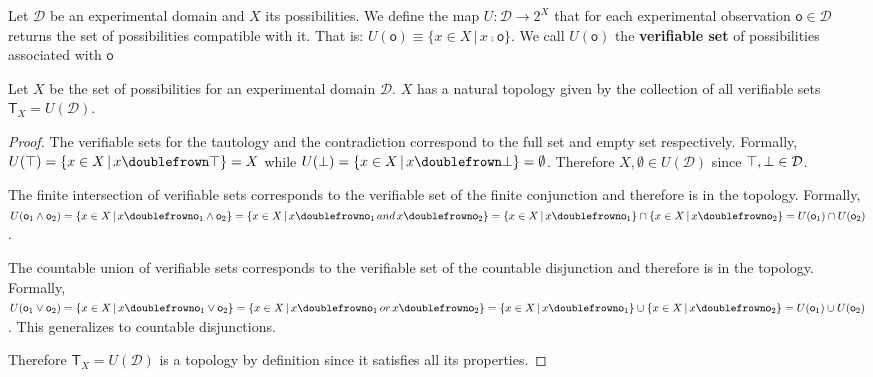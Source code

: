 \documentclass[11pt,letterpaper,fleqn]{memoir} %
\begin{document}
\begin{mathSection}
	
\begin{defn}
	Let $\mathcal{D}$ be an experimental domain and $X$ its possibilities. We define the map $U : \mathcal{D} \rightarrow 2^X$ that for each experimental observation $\mathsf{o} \in \mathcal{D}$ returns the set of possibilities compatible with it. That is: $U(\mathsf{o})\equiv\{ x \in X \, | \, x \comp \mathsf{o}\}$. We call $U(\mathsf{o})$ the \textbf{verifiable set} of possibilities associated with $\mathsf{o}$
\end{defn}

\begin{prop}
	Let $X$ be the set of possibilities for an experimental domain $\mathcal{D}$. $X$ has a natural topology given by the collection of all verifiable sets $\mathsf{T}_X=U(\mathcal{D})$.
\end{prop}

\begin{proof}
	The verifiable sets for the tautology and the contradiction correspond to the full set and empty set respectively. Formally, $U(\tautology) = \{ x \in X \, | \, x \comp \tautology\} = X$ while $U(\contradiction) = \{ x \in X \, | \, x \comp \contradiction\} = \emptyset$. Therefore $X, \emptyset \in U(\mathcal{D})$ since $\top, \bot \in \mathcal{D}$.

	The finite intersection of verifiable sets corresponds to the verifiable set of the finite conjunction and therefore is in the topology. Formally, $U(\obs{o}_1\AND\obs{o}_2) = \{ x \in X \, | \, x \comp \obs{o}_1\AND\obs{o}_2\} =  \{ x \in X \, | \, x \comp \obs{o}_1 \, and \, x \comp \obs{o}_2\} = \{ x \in X \, | \, x \comp \obs{o}_1\} \cap \{ x \in X \, | \, x \comp \obs{o}_2\} = U(\obs{o}_1) \cap U(\obs{o}_2)$.

	The countable union of verifiable sets corresponds to the verifiable set of the countable disjunction and therefore is in the topology. Formally, $U(\obs{o}_1\OR\obs{o}_2) = \{ x \in X \, | \, x \comp \obs{o}_1\OR\obs{o}_2\} =  \{ x \in X \, | \, x \comp \obs{o}_1 \, or \, x \comp \obs{o}_2\} = \{ x \in X \, | \, x \comp \obs{o}_1\} \cup \{ x \in X \, | \, x \comp \obs{o}_2\} = U(\obs{o}_1) \cup U(\obs{o}_2)$. This generalizes to countable disjunctions.

	Therefore $\mathsf{T}_X=U(\mathcal{D})$ is a topology by definition since it satisfies all its properties.
\end{proof}
\end{mathSection}
\end{document}
